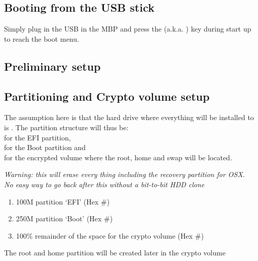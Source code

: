 \subsection{Booting from the USB stick}

Simply plug in the USB in the MBP and press the  (a.k.a. ) key during start up
to reach the boot menu.

\subsection{Preliminary setup}


\subsection{Partitioning and Crypto volume setup}

The assumption here is that the hard drive where everything will be installed to is . The partition structure will thus be: \\
 for the EFI partition,\\
 for the Boot partition and\\
 for the encrypted volume where the root, home and swap will be located.\\

\begin{blocksection}
	\textit{Warning: this will erase every thing including the recovery partition for OSX. \\
	No easy way to go back after this without a bit-to-bit HDD clone}
	\begin{enumerate}
 		\item 100M partition `EFI' (Hex \#)
	 	\item 250M partition `Boot' (Hex \#)
	 	\item 100\% remainder of the space for the crypto volume (Hex \#)
	\end{enumerate}
	The root and home partition will be created later in the crypto volume
\end{blocksection}

